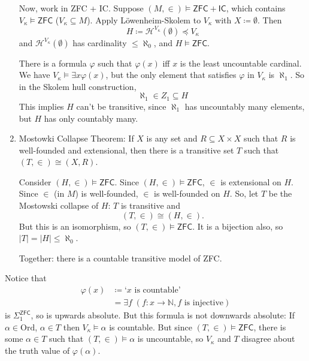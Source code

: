 \documentclass{article}
\let\models\vDash
\begin{document}
\begin{enumerate}
    Now, work in \textsf{ZFC} + \textsf{IC}. Suppose $(M, \in) \models \textsf{ZFC} + \textsf{IC}$, which contains $V_\kappa \models \textsf{ZFC}$ ($V_\kappa \subseteq M$).
    Apply L\"owenheim-Skolem to $V_\kappa$ with $X \coloneqq \emptyset$. Then
    \begin{equation*}
      H \coloneqq \mathcal{H}^{V_\kappa}(\emptyset) \preccurlyeq V_\kappa
    \end{equation*}
    and $\mathcal{H}^{V_\kappa}(\emptyset)$ has cardinality $\leq \aleph_0$, and $H \models \textsf{ZFC}$.

    There is a formula $\varphi$ such that $\varphi(x)$ iff $x$ is the least uncountable cardinal.
    We have $V_\kappa \models \exists x \varphi(x)$, but the only element that satisfies $\varphi$ in $V_\kappa$ is $\aleph_1$.
    So in the Skolem hull construction,
    \begin{equation*}
      \aleph_1 \in Z_1 \subseteq H
    \end{equation*}
    This implies $H$ can't be transitive, since $\aleph_1$ has uncountably many elements, but $H$ has only countably many.
  \item Mostowki Collapse Theorem:
    If $X$ is any set and $R \subseteq X \times X$ such that $R$ is well-founded and extensional, then there is a transitive set $T$ such that $(T, \in) \cong (X,R)$.

    Consider $(H,\in) \models \textsf{ZFC}$. Since $(H,\in) \models \textsf{ZFC}$, $\in$ is extensional on $H$.
    Since $\in$ (in $M$) is well-founded, $\in$ is well-founded on $H$.
    So, let $T$ be the Mostowski collapse of $H$: $T$ is transitive and
    \begin{equation*}
      (T,\in) \cong (H,\in).
    \end{equation*}
    But this is an isomorphism, so $(T,\in) \models \textsf{ZFC}$. It is a bijection also, so $|T| = |H| \leq \aleph_0$.

    Together: there is a countable transitive model of \textsf{ZFC}.
\end{enumerate}

Notice that
\begin{align*}
  \varphi(x) &\coloneqq \text{`}x \text{ is countable'} \\
             &= \exists f \; (f: x \to \mathbb{N}, f \text{ is injective})
\end{align*}
is $\Sigma_1^{\textsf{ZFC}}$, so is upwards absolute.
But this formula is not downwards absolute: If $\alpha \in \textrm{Ord}$, $\alpha \in T$ then $V_\kappa \models \alpha$ is countable. But since $(T,\in) \models \textsf{ZFC}$, there is some $\alpha \in T$ such that $(T,\in) \models \alpha$ is uncountable, so $V_\kappa$ and $T$ disagree about the truth value of $\varphi(\alpha)$.
\end{document}
